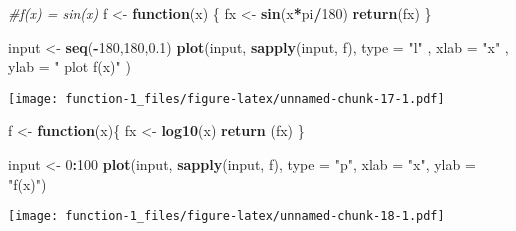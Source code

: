 \documentclass[
]{article}
\newenvironment{Shaded}{\begin{snugshade}}{\end{snugshade}}
\newcommand{\CommentTok}[1]{\textcolor[rgb]{0.56,0.35,0.01}{\textit{#1}}}
\newcommand{\ControlFlowTok}[1]{\textcolor[rgb]{0.13,0.29,0.53}{\textbf{#1}}}
\newcommand{\DataTypeTok}[1]{\textcolor[rgb]{0.13,0.29,0.53}{#1}}
\newcommand{\DecValTok}[1]{\textcolor[rgb]{0.00,0.00,0.81}{#1}}
\newcommand{\FloatTok}[1]{\textcolor[rgb]{0.00,0.00,0.81}{#1}}
\newcommand{\KeywordTok}[1]{\textcolor[rgb]{0.13,0.29,0.53}{\textbf{#1}}}
\newcommand{\NormalTok}[1]{#1}
\newcommand{\OperatorTok}[1]{\textcolor[rgb]{0.81,0.36,0.00}{\textbf{#1}}}
\newcommand{\StringTok}[1]{\textcolor[rgb]{0.31,0.60,0.02}{#1}}
\begin{document}
\begin{Shaded}
\begin{Highlighting}[]
\CommentTok{#f(x) = sin(x)}
\NormalTok{f <-}\StringTok{ }\ControlFlowTok{function}\NormalTok{(x) \{}
\NormalTok{  fx <-}\StringTok{ }\KeywordTok{sin}\NormalTok{(x}\OperatorTok{*}\NormalTok{pi}\OperatorTok{/}\DecValTok{180}\NormalTok{)}
  \KeywordTok{return}\NormalTok{(fx)}
\NormalTok{\}}

\NormalTok{input <-}\StringTok{ }\KeywordTok{seq}\NormalTok{(}\OperatorTok{-}\DecValTok{180}\NormalTok{,}\DecValTok{180}\NormalTok{,}\FloatTok{0.1}\NormalTok{)}
\KeywordTok{plot}\NormalTok{(input, }\KeywordTok{sapply}\NormalTok{(input, f), }\DataTypeTok{type =} \StringTok{"l"}\NormalTok{ , }\DataTypeTok{xlab =} \StringTok{"x"}\NormalTok{ , }\DataTypeTok{ylab =} \StringTok{" plot f(x)"}\NormalTok{ )}
\end{Highlighting}
\end{Shaded}

\texttt{[image: function-1\_files/figure-latex/unnamed-chunk-17-1.pdf]}

\begin{Shaded}
\begin{Highlighting}[]
\NormalTok{f <-}\StringTok{ }\ControlFlowTok{function}\NormalTok{(x)\{}
\NormalTok{  fx <-}\StringTok{ }\KeywordTok{log10}\NormalTok{(x)}
  \KeywordTok{return}\NormalTok{ (fx)}
\NormalTok{\}}

\NormalTok{input <-}\StringTok{ }\DecValTok{0}\OperatorTok{:}\DecValTok{100}
\KeywordTok{plot}\NormalTok{(input, }\KeywordTok{sapply}\NormalTok{(input, f), }\DataTypeTok{type =} \StringTok{"p"}\NormalTok{, }\DataTypeTok{xlab =} \StringTok{"x"}\NormalTok{, }\DataTypeTok{ylab =} \StringTok{"f(x)"}\NormalTok{)}
\end{Highlighting}
\end{Shaded}

\texttt{[image: function-1\_files/figure-latex/unnamed-chunk-18-1.pdf]}
\end{document}
